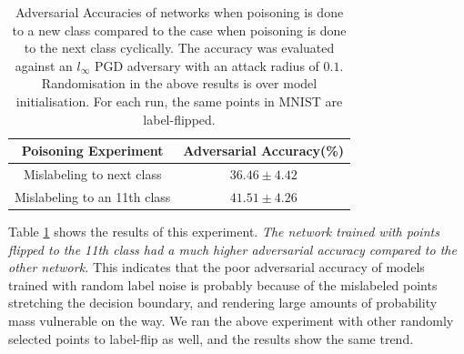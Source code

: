 \documentclass[12pt, oneside]{book}
\begin{document}
\begin{table}[h!]
\centering
\begin{tabular}{|c | c|} 
 \hline
 Poisoning Experiment & Adversarial Accuracy(\%) \\ [0.5ex] 
 \hline\hline
 Mislabeling to next class & $36.46 \pm 4.42$ \\
 \hline
 Mislabeling to an 11th class & $41.51 \pm 4.26$\\
 \hline
\end{tabular}
\caption{Adversarial Accuracies of networks when poisoning is done to a new
class compared to the case when poisoning is done to the next class cyclically.
The accuracy was evaluated against an $l_\infty$ PGD adversary with an attack
radius of $0.1$. Randomisation in the above results is over model
initialisation. For each run, the same points in MNIST are label-flipped.}
\label{table:mnist-class-10}
\end{table}

Table \ref{table:mnist-class-10} shows the results of this experiment. \emph{The
network trained with points flipped to the 11th class had a much higher
adversarial accuracy compared to the other network.} This indicates that the
poor adversarial accuracy of models trained with random label noise is probably
because of the mislabeled points stretching the decision boundary, and rendering
large amounts of probability mass vulnerable on the way. We ran the above
experiment with other randomly selected points to label-flip as well, and the
results show the same trend.


\end{document}
